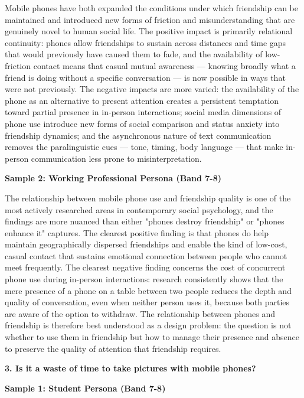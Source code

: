 Mobile phones have both expanded the conditions under which friendship can be maintained and introduced new forms of friction and misunderstanding that are genuinely novel to human social life. The positive impact is primarily relational continuity: phones allow friendships to sustain across distances and time gaps that would previously have caused them to fade, and the availability of low-friction contact means that casual mutual awareness — knowing broadly what a friend is doing without a specific conversation — is now possible in ways that were not previously. The negative impacts are more varied: the availability of the phone as an alternative to present attention creates a persistent temptation toward partial presence in in-person interactions; social media dimensions of phone use introduce new forms of social comparison and status anxiety into friendship dynamics; and the asynchronous nature of text communication removes the paralinguistic cues — tone, timing, body language — that make in-person communication less prone to misinterpretation.

\textbf{Sample 2: Working Professional Persona (Band 7-8)}

The relationship between mobile phone use and friendship quality is one of the most actively researched areas in contemporary social psychology, and the findings are more nuanced than either "phones destroy friendship" or "phones enhance it" captures. The clearest positive finding is that phones do help maintain geographically dispersed friendships and enable the kind of low-cost, casual contact that sustains emotional connection between people who cannot meet frequently. The clearest negative finding concerns the cost of concurrent phone use during in-person interactions: research consistently shows that the mere presence of a phone on a table between two people reduces the depth and quality of conversation, even when neither person uses it, because both parties are aware of the option to withdraw. The relationship between phones and friendship is therefore best understood as a design problem: the question is not whether to use them in friendship but how to manage their presence and absence to preserve the quality of attention that friendship requires.

\separator

\begin{ieltsquestion}
\textbf{3. Is it a waste of time to take pictures with mobile phones?}
\end{ieltsquestion}
\textbf{Sample 1: Student Persona (Band 7-8)}

